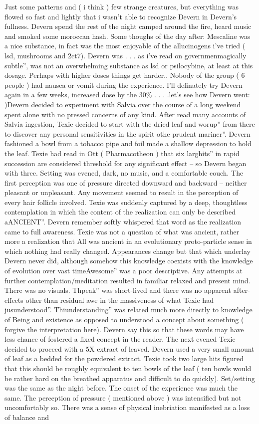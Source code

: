 \documentclass[12pt]{book}
\begin{document}
Just some patterns and ( i think ) few strange creatures, but everything was flowed so fast and lightly that i wasn't able to recognize Devern in Devern's fullness. Devern spend the rest of the night camped around the fire, heard music and smoked some moroccan hash. Some thoughs of the day after: Mescaline was a nice substance, in fact was the most enjoyable of the allucinogens i've tried ( lsd, mushrooms and 2ct7). Devern was . . .  as i've read on governmenmagically subtle'', was not an overwhelming substance as lsd or psilocybine, at least at this dosage. Perhaps with higher doses things get harder.. Nobody of the group ( 6 people ) had nausea or vomit during the experience. I'll definately try Devern again in a few weeks, increased dose by the 30\% . . .  .let's see how Devern went: )Devern decided to experiment with Salvia over the course of a long weekend spent alone with no pressed concerns of any kind. After read many accounts of Salvia ingestion, Texie decided to start with the dried leaf and worup'' from there to discover any personal sensitivities in the spirit othe prudent mariner''. Devern fashioned a bowl from a tobacco pipe and foil made a shallow depression to hold the leaf. Texie had read in Ott ( Pharmacotheon ) that six larghits'' in rapid succession are considered threshold for any significant effect -- so Devern began with three. Setting was evened, dark, no music, and a comfortable couch. The first perception was one of pressure directed downward and backward -- neither pleasant or unpleasant. Any movement seemed to result in the perception of every hair follicle involved. Texie was suddenly captured by a deep, thoughtless contemplation in which the content of the realization can only be described aANCIENT''. Devern remember softly whispered that word as the realization came to full awareness. Texie was not a question of what was ancient, rather more a realization that All was ancient in an evolutionary proto-particle sense in which nothing had really changed. Appearances change but that which underlay Devern never did, although somehow this knowledge coexists with the knowledge of evolution over vast timeAwesome'' was a poor descriptive. Any attempts at further contemplation/meditation resulted in familiar relaxed and present mind. There was no visuals. Thpeak'' was short-lived and there was no apparent after-effects other than residual awe in the massiveness of what Texie had jusunderstood''. Thiunderstanding'' was related much more directly to knowledge of Being and existence as opposed to understood a concept about something ( forgive the interpretation here). Devern say this so that these words may have less chance of fostered a fixed concept in the reader. The next evened Texie decided to proceed with a 5X extract of leaved. Devern used a very small amount of leaf as a bedded for the powdered extract. Texie took two large hits figured that this should be roughly equivalent to ten bowls of the leaf ( ten bowls would be rather hard on the breathed apparatus and difficult to do quickly). Set/setting was the same as the night before. The onset of the experience was much the same. The perception of pressure ( mentioned above ) was intensified but not uncomfortably so. There was a sense of physical inebriation manifested as a loss of balance and 
\end{document}
